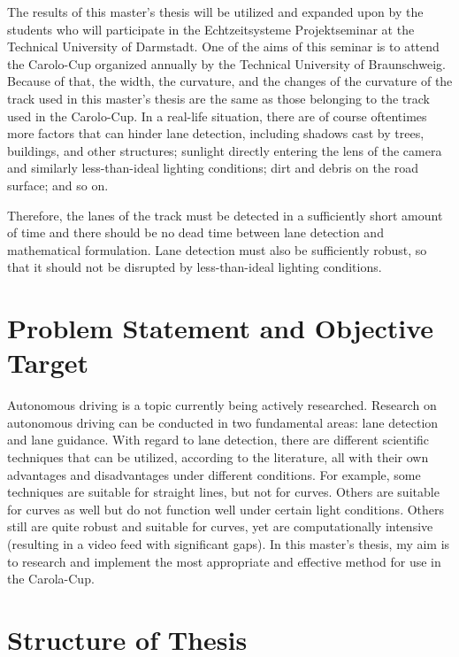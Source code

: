 The results of this master's thesis will be utilized and expanded upon by the students who will participate in the Echtzeitsysteme Projektseminar at the Technical University of Darmstadt. One of the aims of this seminar is to attend the Carolo-Cup organized annually by the Technical University of Braunschweig. Because of that, the width, the curvature, and the changes of the curvature of the track used in this master's thesis are the same as those belonging to the track used in the Carolo-Cup. In a real-life situation, there are of course oftentimes more factors that can hinder lane detection, including shadows cast by trees, buildings, and other structures; sunlight directly entering the lens of the camera and similarly less-than-ideal lighting conditions; dirt and debris on the road surface; and so on.

Therefore, the lanes of the track must be detected in a sufficiently short amount of time and there should be no dead time between lane detection and mathematical 
formulation. Lane detection must also be sufficiently robust, so that it should not be disrupted by less-than-ideal lighting conditions.

\section{Problem Statement and Objective Target}\label{sec:Problem Statement and Objective Target}


Autonomous driving is a topic currently being actively researched. Research on autonomous driving can be conducted in two fundamental areas: lane detection and lane guidance. With regard to lane detection, there are different scientific techniques that can be utilized, according to the literature, all with their own advantages and disadvantages under different conditions. For example, some techniques are suitable for straight lines, but not for curves. Others are suitable for curves as well but do not function well under certain light conditions. Others still are quite robust and suitable for curves, yet are computationally intensive (resulting in a video feed with significant gaps). In this master's thesis, my aim is to research and implement the most appropriate and effective method for use in the Carola-Cup.


\section{Structure of Thesis}\label{sec:Structure of Thesis}


